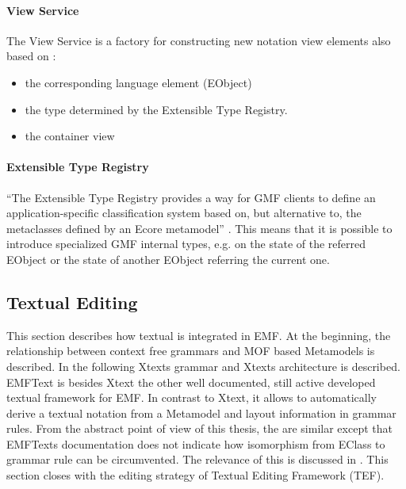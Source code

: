 \paragraph{View Service}
The View Service is a factory for constructing new notation view elements also based on \cite{GMFDoc}:
\begin{itemize}
	\item the corresponding language element (EObject)
	\item the type determined by the Extensible Type Registry.
	\item the container view  
\end{itemize}

\paragraph{Extensible Type Registry}
``The Extensible Type Registry provides a way for GMF clients to define an application-specific classification system based on, but alternative to, the metaclasses defined by an Ecore metamodel'' \cite{GMFDoc}. This means that it is possible to introduce specialized GMF internal types, e.g. on the state of the referred EObject or the state of another EObject referring the current one.










 

\subsection{Textual Editing}
This section describes how textual is integrated in EMF. At the beginning, the relationship between context free grammars and MOF based Metamodels is described. In the following Xtexts \cite{XTextMan} grammar and Xtexts architecture is described. EMFText \cite{EMFTextMan} is besides Xtext the other well documented, still active developed textual framework for EMF. In contrast to Xtext, it allows to automatically derive a textual notation from a Metamodel and layout information in grammar rules. From the abstract point of view of this thesis, the are similar except that EMFTexts documentation does not indicate how isomorphism from EClass to grammar rule can be circumvented. The relevance of this is discussed in . This section closes with the editing strategy of Textual Editing Framework (TEF).


